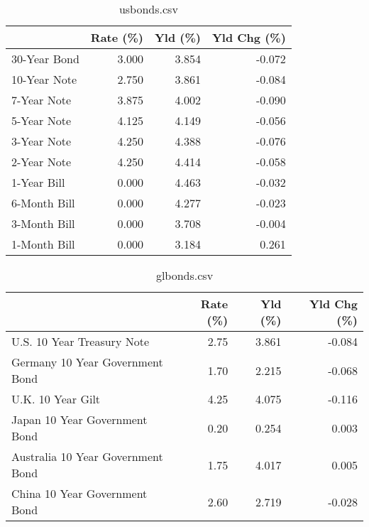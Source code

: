 \documentclass{article}%
\begin{document}
%


\begin{table}[htbp]%
\caption{usbonds.csv}%
\centering%
\begin{adjustbox}{width=1\textwidth}%
\begin{tabular}{lrrr}
\toprule
             &  Rate (\%) &  Yld (\%) &  Yld Chg (\%) \\
\midrule
30-Year Bond &     3.000 &    3.854 &       -0.072 \\
10-Year Note &     2.750 &    3.861 &       -0.084 \\
 7-Year Note &     3.875 &    4.002 &       -0.090 \\
 5-Year Note &     4.125 &    4.149 &       -0.056 \\
 3-Year Note &     4.250 &    4.388 &       -0.076 \\
 2-Year Note &     4.250 &    4.414 &       -0.058 \\
 1-Year Bill &     0.000 &    4.463 &       -0.032 \\
6-Month Bill &     0.000 &    4.277 &       -0.023 \\
3-Month Bill &     0.000 &    3.708 &       -0.004 \\
1-Month Bill &     0.000 &    3.184 &        0.261 \\
\bottomrule
\end{tabular}
%
\end{adjustbox}%
\end{table}

%


\begin{table}[htbp]%
\caption{glbonds.csv}%
\centering%
\begin{adjustbox}{width=1\textwidth}%
\begin{tabular}{lrrr}
\toprule
                                  &  Rate (\%) &  Yld (\%) &  Yld Chg (\%) \\
\midrule
       U.S. 10 Year Treasury Note &      2.75 &    3.861 &       -0.084 \\
  Germany 10 Year Government Bond &      1.70 &    2.215 &       -0.068 \\
                U.K. 10 Year Gilt &      4.25 &    4.075 &       -0.116 \\
    Japan 10 Year Government Bond &      0.20 &    0.254 &        0.003 \\
Australia 10 Year Government Bond &      1.75 &    4.017 &        0.005 \\
    China 10 Year Government Bond &      2.60 &    2.719 &       -0.028 \\
\bottomrule
\end{tabular}
%
\end{adjustbox}%
\end{table}
\end{document}
